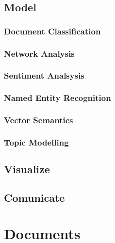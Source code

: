 \documentclass[]{book}
\theoremstyle{definition}
\theoremstyle{definition}
\theoremstyle{definition}
\theoremstyle{remark}
\begin{document}
\subsection{Model}\label{sota_tools_model}

\subsubsection{Document
Classification}\label{sota_tools_model_doc_class}

\subsubsection{Network Analysis}\label{sota_tools_model_net_anal}

\subsubsection{Sentiment Analsysis}\label{sota_tools_model_sent_anal}

\subsubsection{Named Entity Recognition}\label{sota_tools_model_ner}

\subsubsection{Vector Semantics}\label{sota_tools_model_vec}

\subsubsection{Topic Modelling}\label{sota_tools_model_topic_model}

\subsection{Visualize}\label{sota_tools_visualize}

\subsection{Comunicate}\label{sota_tools_comunicate}

\section{Documents}\label{sota_documents}
\end{document}
